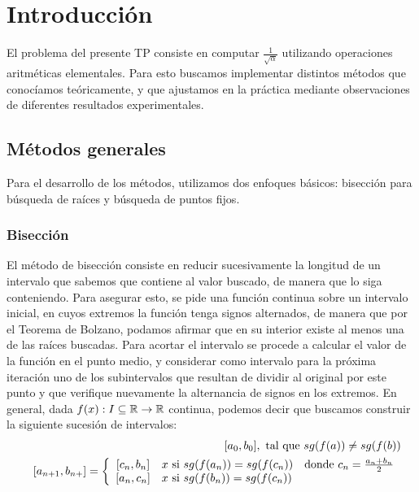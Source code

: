 \section{Introducción}
El problema del presente TP consiste en computar $\frac{1}{\sqrt{\alpha}}$ utilizando operaciones aritméticas elementales. Para esto buscamos implementar distintos métodos que conocíamos teóricamente, y que ajustamos en la práctica mediante observaciones de diferentes resultados experimentales.

\subsection{Métodos generales}
Para el desarrollo de los métodos, utilizamos dos enfoques básicos: bisección para búsqueda de raíces y búsqueda de puntos fijos.
\subsubsection{Bisección}
El método de bisección consiste en reducir sucesivamente la longitud de un intervalo que sabemos que contiene al valor buscado, de manera que lo siga conteniendo. Para asegurar esto, se pide una función continua sobre un intervalo inicial, en cuyos extremos la función tenga signos alternados, de manera que por el Teorema de Bolzano, podamos afirmar que en su interior existe al menos una de las raíces buscadas. Para acortar el intervalo se procede a calcular el valor de la función en el punto medio, y considerar como intervalo para la próxima iteración uno de los subintervalos que resultan de dividir al original por este punto y que verifique nuevamente la alternancia de signos en los extremos. En general, dada $f(x): I\subseteq \mathbb{R} \rightarrow \mathbb{R} $ continua, podemos decir que buscamos construir la siguiente sucesión de intervalos:
	\begin{eqnarray}
		&& [a_0, b_0], \text{ tal que } sg(f(a)) \neq sg(f(b)) \nonumber \\
		&& [a_{n+1}, b_{n+}] = \left\{
			\begin{array}{c l l }
  				[c_n, b_n] & x\mbox{ si } sg(f(a_n)) = sg(f(c_n)) & \mbox{donde } c_n = \frac{a_n+b_n}{2} \nonumber \\
  				 \left[a_{n}, c_{n}\right] & x\mbox{ si } sg(f(b_n)) = sg(f(c_n)) &  \nonumber \\ %
			\end{array} \nonumber
		\right.		\nonumber \\
	\end{eqnarray}

